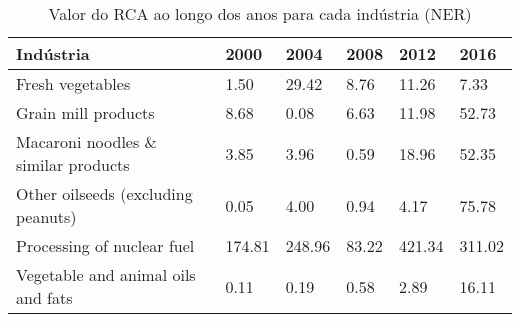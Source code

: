 \begin{table}
\centering
\caption{Valor do RCA ao longo dos anos para cada indústria (NER)}
\begin{tabular}{p{6cm}p{1.5cm}p{1.5cm}p{1.5cm}p{1.5cm}p{1.5cm}}
\toprule
                          Indústria &   2000 &   2004 &  2008 &   2012 &   2016 \\
\midrule
                   Fresh vegetables &   1.50 &  29.42 &  8.76 &  11.26 &   7.33 \\
                Grain mill products &   8.68 &   0.08 &  6.63 &  11.98 &  52.73 \\
Macaroni noodles \& similar products &   3.85 &   3.96 &  0.59 &  18.96 &  52.35 \\
 Other oilseeds (excluding peanuts) &   0.05 &   4.00 &  0.94 &   4.17 &  75.78 \\
         Processing of nuclear fuel & 174.81 & 248.96 & 83.22 & 421.34 & 311.02 \\
 Vegetable and animal oils and fats &   0.11 &   0.19 &  0.58 &   2.89 &  16.11 \\
\bottomrule
\end{tabular}
\end{table}
